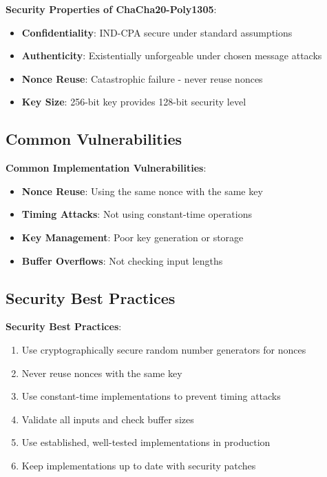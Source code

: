 \documentclass[11pt,a4paper]{article}
\begin{document}
\begin{mathbox}
\textbf{Security Properties of ChaCha20-Poly1305}:
\begin{itemize}
    \item \textbf{Confidentiality}: IND-CPA secure under standard assumptions
    \item \textbf{Authenticity}: Existentially unforgeable under chosen message attacks
    \item \textbf{Nonce Reuse}: Catastrophic failure - never reuse nonces
    \item \textbf{Key Size}: 256-bit key provides 128-bit security level
\end{itemize}
\end{mathbox}

\subsection{Common Vulnerabilities}

\begin{warningbox}
\textbf{Common Implementation Vulnerabilities}:
\begin{itemize}
    \item \textbf{Nonce Reuse}: Using the same nonce with the same key
    \item \textbf{Timing Attacks}: Not using constant-time operations
    \item \textbf{Key Management}: Poor key generation or storage
    \item \textbf{Buffer Overflows}: Not checking input lengths
\end{itemize}
\end{warningbox}

\subsection{Security Best Practices}

\begin{prosbox}
\textbf{Security Best Practices}:
\begin{enumerate}
    \item Use cryptographically secure random number generators for nonces
    \item Never reuse nonces with the same key
    \item Use constant-time implementations to prevent timing attacks
    \item Validate all inputs and check buffer sizes
    \item Use established, well-tested implementations in production
    \item Keep implementations up to date with security patches
\end{enumerate}
\end{prosbox}
\end{document}
